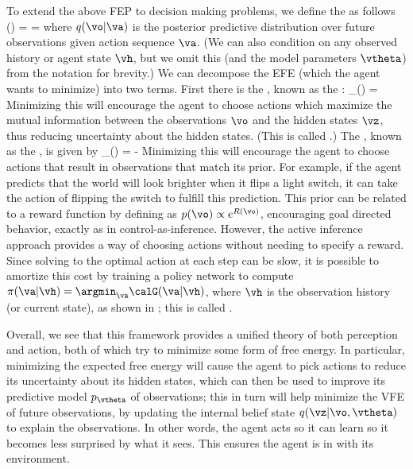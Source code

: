 To extend the above FEP to decision making problems,
we define the 
as follows
\be
\calG(\va) 
= 
= 
\ee
where $q(\vo|\va)$ is the posterior predictive distribution
over future observations given action sequence $\va$.
(We can also condition on any observed  history or agent state $\vh$,
but we omit this (and the model parameters $\vtheta$) from the notation for brevity.)
We can decompose the EFE (which the agent wants to minimize)
into two terms.
First there is the ,
known as the :
\be
\calG_{}(\va) = 
\ee
Minimizing this will encourage the agent to choose actions
which maximize the mutual information between
the observations $\vo$ and the hidden states $\vz$,
thus reducing uncertainty about the hidden states.
(This is called .)
The ,
known as the ,
is given by
\be
\calG_{}(\va) = -
\ee
Minimizing this will encourage the agent to choose actions
that result in observations that match its prior.
For example, if the agent predicts that the world will look brighter
when it flips a light switch, it can take the action of flipping
the switch to fulfill this prediction.
This prior can be related to a reward function by defining
as $p(\vo) \propto e^{R(\vo)}$, encouraging goal directed behavior,
exactly as in control-as-inference.
However, the active inference approach provides
a way of choosing actions without needing to specify a reward.
Since solving to the optimal action at each step can be slow,
it is possible to amortize this cost by training a policy network to compute
$\pi(\va|\vh) = \argmin_{\va} \calG(\va|\vh)$,
where $\vh$ is the observation history (or current state),
as shown in \citep{Millidge2020vpg,van-der-Himst2020};
this is called .


Overall, we see that this framework
provides a unified theory of both perception and action,
both of which try to minimize some form of free energy.
In particular, minimizing the expected free energy will cause
the agent to pick actions to reduce its uncertainty about its hidden states,
which can then be used to improve its predictive model $p_\vtheta$
of observations; this in turn will help minimize the VFE of future observations,
by updating the internal belief state $q(\vz|\vo,\vtheta)$
to explain the observations.
In other words,
the agent acts so it can learn so it becomes less surprised
by what it sees.
This ensures the agent is in  with its environment.




